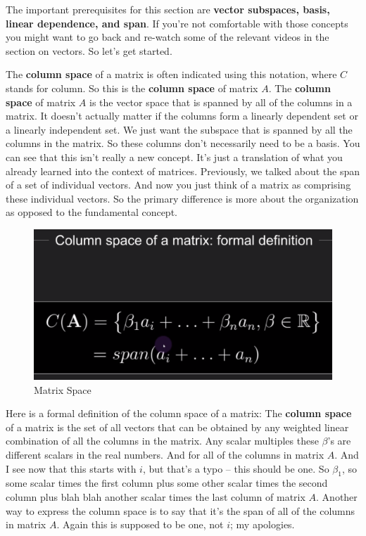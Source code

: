 \documentclass[fleqn,10pt]{olplainarticle}
\theoremstyle{definition}
\theoremstyle{remark}
\begin{document}
The important prerequisites for this section are \textbf{vector subspaces, basis, linear dependence, and span}. If you're not comfortable with those concepts you might want to go back and re-watch some of the relevant videos in the section on vectors. So let's get started.

The \textbf{column space} of a matrix is often indicated using this notation, where $C$ stands for column. So this is the \textbf{column space} of matrix $A$. The \textbf{column space} of matrix $A$ is the vector space that is spanned by all of the columns in a matrix. It doesn't actually matter if the columns form a linearly dependent set or a linearly independent set. We just want the subspace that is spanned by all the columns in the matrix. So these columns don't necessarily need to be a basis. You can see that this isn't really a new concept. It's just a translation of what you already learned into the context of matrices. Previously, we talked about the span of a set of individual vectors. And now you just think of a matrix as comprising these individual vectors. So the primary difference is more about the organization as opposed to the fundamental concept.

\begin{figure}[ht]
	\centering
	\includegraphics[width=0.5\linewidth]{images/matrix-space-02.png}
	\caption{Matrix Space}
	\label{fig:matrix_space_02}
\end{figure}

Here is a formal definition of the column space of a matrix: The \textbf{column space} of a matrix is the set of all vectors that can be obtained by any weighted linear combination of all the columns in the matrix. Any scalar multiples these $\beta$'s are different scalars in the real numbers. And for all of the columns in matrix $A$. And I see now that this starts with $i$, but that's a typo -- this should be one. So $\beta_1$, so some scalar times the first column plus some other scalar times the second column plus blah blah another scalar times the last column of matrix $A$. Another way to express the column space is to say that it's the span of all of the columns in matrix $A$. Again this is supposed to be one, not $i$; my apologies.
\end{document}
